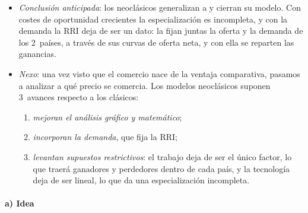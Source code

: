 \documentclass[11pt]{article}
\begin{document}
\begin{itemize}
\item \emph{Conclusión anticipada}: los neoclásicos generalizan a  y cierran su modelo. Con costes de oportunidad crecientes la especialización es incompleta, y con la demanda la RRI deja de ser un dato: la fijan juntas la oferta y la demanda de los 2~países, a través de sus curvas de oferta neta, y con ella se reparten las ganancias.

\item \emph{Nexo}: una vez visto que el comercio nace de la ventaja comparativa, pasamos a analizar a qué precio se comercia. Los modelos neoclásicos suponen 3~avances respecto a los clásicos:
  \begin{enumerate}
  \item \emph{mejoran el análisis gráfico y matemático};
  \item \emph{incorporan la demanda}, que fija la RRI;
  \item \emph{levantan supuestos restrictivos}: el trabajo deja de ser el único factor, lo que traerá ganadores y perdedores dentro de cada país, y la tecnología deja de ser lineal, lo que da una especialización incompleta.
  \end{enumerate}
\end{itemize}

\paragraph{a) Idea}
\end{document}
